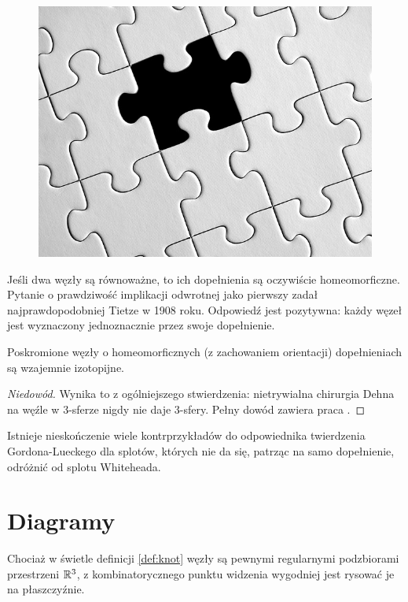 \begin{figure}[H]
\begin{minipage}[b]{.32\linewidth}
		\includegraphics[width=\linewidth]{../data/missing.jpg}
	\end{minipage}
\end{figure}

Jeśli dwa węzły są równoważne, to ich dopełnienia są oczywiście homeomorficzne.
Pytanie o prawdziwość implikacji odwrotnej jako pierwszy zadał najprawdopodobniej Tietze w 1908 roku.
Odpowiedź jest pozytywna: każdy węzeł jest wyznaczony jednoznacznie przez swoje dopełnienie.

\begin{theorem} \label{thm_gordon_luecke}
	Poskromione węzły o homeomorficznych (z zachowaniem orientacji) dopełnieniach są wzajemnie izotopijne.
\end{theorem}

\begin{proof}[Niedowód]
	Wynika to z ogólniejszego stwierdzenia:
	nietrywialna chirurgia Dehna na węźle w 3-sferze nigdy nie daje 3-sfery.
	Pełny dowód zawiera praca \cite{gordon89}.
\end{proof}

Istnieje nieskończenie wiele kontrprzykładów do odpowiednika twierdzenia Gordona-Lueckego dla splotów,
których nie da się, patrząc na samo dopełnienie, odróżnić od splotu Whiteheada.

\section{Diagramy}
Chociaż w świetle definicji \ref{def:knot} węzły są pewnymi regularnymi podzbiorami przestrzeni $\mathbb R^3$,
z kombinatorycznego punktu widzenia wygodniej jest rysować je na  płaszczyźnie.

